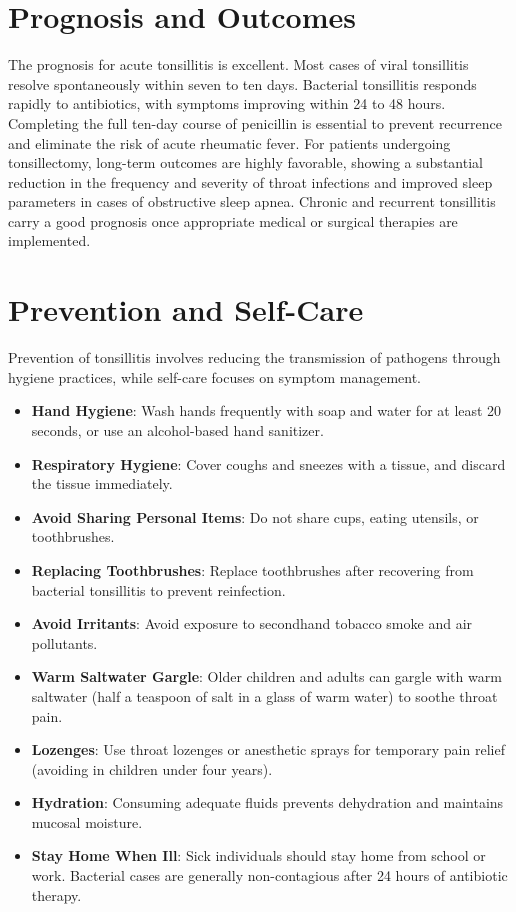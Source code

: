 \section*{Prognosis and Outcomes}
The prognosis for acute tonsillitis is excellent. Most cases of viral tonsillitis resolve spontaneously within seven to ten days. Bacterial tonsillitis responds rapidly to antibiotics, with symptoms improving within 24 to 48 hours. Completing the full ten-day course of penicillin is essential to prevent recurrence and eliminate the risk of acute rheumatic fever. For patients undergoing tonsillectomy, long-term outcomes are highly favorable, showing a substantial reduction in the frequency and severity of throat infections and improved sleep parameters in cases of obstructive sleep apnea. Chronic and recurrent tonsillitis carry a good prognosis once appropriate medical or surgical therapies are implemented.

\section*{Prevention and Self-Care}
Prevention of tonsillitis involves reducing the transmission of pathogens through hygiene practices, while self-care focuses on symptom management.
\begin{itemize}
    \item \textbf{Hand Hygiene}: Wash hands frequently with soap and water for at least 20 seconds, or use an alcohol-based hand sanitizer.
    \item \textbf{Respiratory Hygiene}: Cover coughs and sneezes with a tissue, and discard the tissue immediately.
    \item \textbf{Avoid Sharing Personal Items}: Do not share cups, eating utensils, or toothbrushes.
    \item \textbf{Replacing Toothbrushes}: Replace toothbrushes after recovering from bacterial tonsillitis to prevent reinfection.
    \item \textbf{Avoid Irritants}: Avoid exposure to secondhand tobacco smoke and air pollutants.
    \item \textbf{Warm Saltwater Gargle}: Older children and adults can gargle with warm saltwater (half a teaspoon of salt in a glass of warm water) to soothe throat pain.
    \item \textbf{Lozenges}: Use throat lozenges or anesthetic sprays for temporary pain relief (avoiding in children under four years).
    \item \textbf{Hydration}: Consuming adequate fluids prevents dehydration and maintains mucosal moisture.
    \item \textbf{Stay Home When Ill}: Sick individuals should stay home from school or work. Bacterial cases are generally non-contagious after 24 hours of antibiotic therapy.
\end{itemize}

